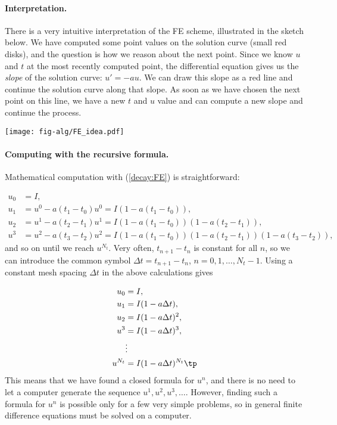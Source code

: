 \documentclass[graybox,sectrefs,envcountresetchap,open=right,final]{svmonodo}
\begin{document}
\paragraph{Interpretation.}
There is a very intuitive interpretation of the FE scheme, illustrated
in the sketch below. We have computed some point values
on the solution curve (small red disks), and the question is how we reason
about the next point. Since we know $u$ and $t$ at the most recently
computed point, the differential equation gives us the \emph{slope} of
the solution curve: $u'=-au$. We can draw this slope as a red line
and continue the solution curve along that slope. As soon as we have
chosen the next point on this line, we have a new $t$ and $u$ value and
can compute a new slope and continue the process.

\vspace{6mm}

\centerline{\texttt{[image: fig-alg/FE\_idea.pdf]}}

\vspace{6mm}

\paragraph{Computing with the recursive formula.}
Mathematical computation with (\ref{decay:FE}) is straightforward:

\begin{align*}
u_0 &= I,\\ 
u_1 & = u^0 - a(t_{1} -t_0)u^0 = I(1-a(t_1-t_0)),\\ 
u_2 & = u^1 - a(t_{2} -t_1)u^1 = I(1-a(t_1-t_0))(1 - a(t_2-t_1)),\\ 
u^3 &= u^2 - a(t_{3} -t_2)u^2 = I(1-a(t_1-t_0))(1 - a(t_2-t_1))(1 - a(t_3-t_2)),
\end{align*}
and so on until we reach $u^{N_t}$.
Very often, $t_{n+1}-t_n$ is constant for all $n$, so we can introduce
the common symbol
$\Delta t = t_{n+1}-t_n$, $n=0,1,\ldots,N_t-1$.
Using a constant mesh spacing $\Delta t$ in the above calculations gives

\begin{align*}
u_0 &= I,\\ 
u_1 & = I(1-a\Delta t),\\ 
u_2 & = I(1-a\Delta t)^2,\\ 
u^3 &= I(1-a\Delta t)^3,\\ 
&\vdots\\ 
u^{N_t} &= I(1-a\Delta t)^{N_t}\tp
\end{align*}
This means that we have found a closed formula for $u^n$, and there is
no need to let a computer generate the sequence $u^1, u^2, u^3, \ldots$.
However, finding such a formula for $u^n$ is possible only for a few very
simple problems, so in general finite difference equations must be
solved on a computer.
\end{document}

